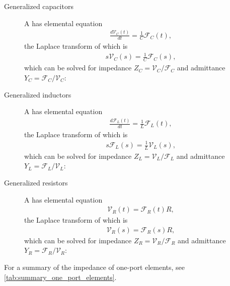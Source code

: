 \documentclass[dynamic_systems.tex]{subfiles}
\begin{document}
\begin{description}
	\item[Generalized capacitors]
	A  has elemental equation
	\begin{align}
		\frac{d \mathcal{V}_C(t)}{d t} = \frac{1}{C} \mathcal{F}_C(t),
	\end{align}
	the Laplace transform of which is
	\begin{align}
		s \mathcal{V}_C(s) = \frac{1}{C} \mathcal{F}_C(s),
	\end{align}
	which can be solved for impedance $Z_C = \mathcal{V}_C/\mathcal{F}_C$ and admittance $Y_C = \mathcal{F}_C/\mathcal{V}_C$:
	\item[Generalized inductors]
	A  has elemental equation
	\begin{align}
		\frac{d \mathcal{F}_L(t)}{d t} = \frac{1}{L} \mathcal{F}_L(t),
	\end{align}
	the Laplace transform of which is
	\begin{align}
		s \mathcal{F}_L(s) = \frac{1}{L} \mathcal{V}_L(s),
	\end{align}
	which can be solved for impedance $Z_L = \mathcal{V}_L/\mathcal{F}_L$ and admittance $Y_L = \mathcal{F}_L/\mathcal{V}_L$:
	\item[Generalized resistors]
	A  has elemental equation
	\begin{align}
		\mathcal{V}_R(t) = \mathcal{F}_R(t) R,
	\end{align}
	the Laplace transform of which is
	\begin{align}
		\mathcal{V}_R(s) = \mathcal{F}_R(s) R,
	\end{align}
	which can be solved for impedance $Z_R = \mathcal{V}_R/\mathcal{F}_R$ and admittance $Y_R = \mathcal{F}_R/\mathcal{V}_R$:
\end{description}

For a summary of the impedance of one-port elements, see \cref{tab:summary_one_port_elements}.
\tags{}
\end{document}
